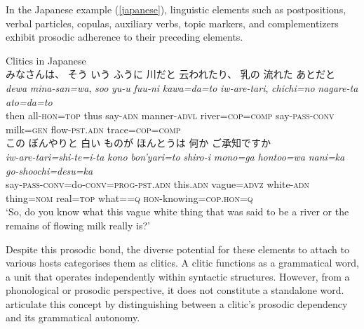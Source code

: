\documentclass[output=paper,colorlinks,citecolor=brown ,chinesefont]{langscibook}
\begin{document}
In the Japanese example (\ref{japanese}), linguistic elements such as postpositions, verbal particles, copulas, auxiliary verbs, topic markers, and complementizers exhibit prosodic adherence to their preceding elements. 

\begin{exe}
\ex\label{japanese} Clitics in Japanese \\
\settowidth {}
 {\cn みなさんは、} {\cn そう} {\cn いう} {\cn ふうに} {\cn 川だと} {\cn 云われたり、} {\cn 乳の} {\cn 流れた} {\cn あとだと} \\
\textit{dewa} 	\textit{mina-san=wa}, 	\textit{soo} 	\textit{yu-u} 		\textit{fuu-ni} 		\textit{kawa=da=to} \textit{iw-are-tari}, 	\textit{chichi=no} 	\textit{nagare-ta} 	\textit{ato=da=to} \\
then 	all-\textsc{hon}=\textsc{top} 	thus 	say-\textsc{adn} 	manner-\textsc{advl} 	river=\textsc{cop}=\textsc{comp} say-\textsc{pass}-\textsc{conv} 	milk=\textsc{gen} 	flow-\textsc{pst}.\textsc{adn} 	trace=\textsc{cop}=\textsc{comp} \\

 {\cn この} {\cn ぼんやりと} {\cn 白い} {\cn ものが} {\cn ほんとうは} {\cn 何か} {\cn ご承知ですか} \\
 \textit{iw-are-tari=shi-te=i-ta}  			\textit{kono}  		\textit{bon'yari=to} 	\textit{shiro-i} 	\textit{mono=ga}  	\textit{hontoo=wa} 	\textit{nani=ka} 	\textit{go-shoochi=desu=ka} \\
 say-\textsc{pass}-\textsc{conv}=do-\textsc{conv}=\textsc{prog}-\textsc{pst}.\textsc{adn}  	this.\textsc{adn}  	vague=\textsc{advz} 	white-\textsc{adn}  thing=\textsc{nom}  	real=\textsc{top} 	what==\textsc{q} 		\textsc{hon}-knowing=\textsc{cop}.\textsc{hon}=\textsc{q} \\ 
\glt ‘So, do you know what this vague white thing that was said to be a river or the remains of flowing milk really is?' %
\end{exe}


Despite this prosodic bond, the diverse potential for these elements to attach to various hosts categorises them as clitics. A clitic functions as a grammatical word, a unit that operates independently within syntactic structures. However, from a phonological or prosodic perspective, it does not constitute a standalone word. \citet[25]{dixon} articulate this concept by distinguishing between a clitic’s prosodic dependency and its grammatical autonomy.
\end{document}

